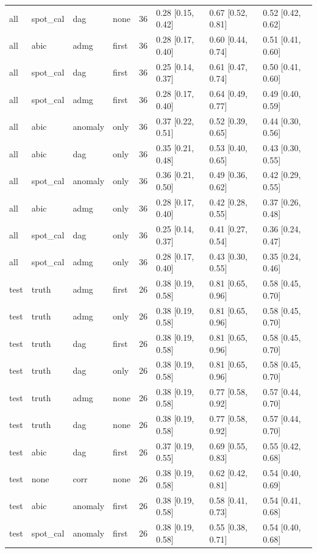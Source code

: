 \begin{table}[t]
\begin{tabular}{@{}llllllll@{}}
all & spot\_cal & dag & none & 36 & 0.28 [0.15, 0.42] & 0.67 [0.52, 0.81] & 0.52 [0.42, 0.62]\\
all & abic & admg & first & 36 & 0.28 [0.17, 0.40] & 0.60 [0.44, 0.74] & 0.51 [0.41, 0.60]\\
all & spot\_cal & dag & first & 36 & 0.25 [0.14, 0.37] & 0.61 [0.47, 0.74] & 0.50 [0.41, 0.60]\\
all & spot\_cal & admg & first & 36 & 0.28 [0.17, 0.40] & 0.64 [0.49, 0.77] & 0.49 [0.40, 0.59]\\
all & abic & anomaly & only & 36 & 0.37 [0.22, 0.51] & 0.52 [0.39, 0.65] & 0.44 [0.30, 0.56]\\
all & abic & dag & only & 36 & 0.35 [0.21, 0.48] & 0.53 [0.40, 0.65] & 0.43 [0.30, 0.55]\\
all & spot\_cal & anomaly & only & 36 & 0.36 [0.21, 0.50] & 0.49 [0.36, 0.62] & 0.42 [0.29, 0.55]\\
all & abic & admg & only & 36 & 0.28 [0.17, 0.40] & 0.42 [0.28, 0.55] & 0.37 [0.26, 0.48]\\
all & spot\_cal & dag & only & 36 & 0.25 [0.14, 0.37] & 0.41 [0.27, 0.54] & 0.36 [0.24, 0.47]\\
all & spot\_cal & admg & only & 36 & 0.28 [0.17, 0.40] & 0.43 [0.30, 0.55] & 0.35 [0.24, 0.46]\\
test & truth & admg & first & 26 & 0.38 [0.19, 0.58] & 0.81 [0.65, 0.96] & 0.58 [0.45, 0.70]\\
test & truth & admg & only & 26 & 0.38 [0.19, 0.58] & 0.81 [0.65, 0.96] & 0.58 [0.45, 0.70]\\
test & truth & dag & first & 26 & 0.38 [0.19, 0.58] & 0.81 [0.65, 0.96] & 0.58 [0.45, 0.70]\\
test & truth & dag & only & 26 & 0.38 [0.19, 0.58] & 0.81 [0.65, 0.96] & 0.58 [0.45, 0.70]\\
test & truth & admg & none & 26 & 0.38 [0.19, 0.58] & 0.77 [0.58, 0.92] & 0.57 [0.44, 0.70]\\
test & truth & dag & none & 26 & 0.38 [0.19, 0.58] & 0.77 [0.58, 0.92] & 0.57 [0.44, 0.70]\\
test & abic & dag & first & 26 & 0.37 [0.19, 0.55] & 0.69 [0.55, 0.83] & 0.55 [0.42, 0.68]\\
test & none & corr & none & 26 & 0.38 [0.19, 0.58] & 0.62 [0.42, 0.81] & 0.54 [0.40, 0.69]\\
test & abic & anomaly & first & 26 & 0.38 [0.19, 0.58] & 0.58 [0.41, 0.73] & 0.54 [0.41, 0.68]\\
test & spot\_cal & anomaly & first & 26 & 0.38 [0.19, 0.58] & 0.55 [0.38, 0.71] & 0.54 [0.40, 0.68]\\

\end{tabular}
\end{table}

